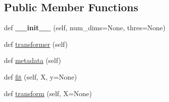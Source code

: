 \subsection*{Public Member Functions}
\begin{DoxyCompactItemize}
\item 
def {\bfseries \+\_\+\+\_\+init\+\_\+\+\_\+} (self, num\+\_\+dims=None, thres=None)\hypertarget{classdml_1_1pca_1_1PCA_a55d22d08e5f8617a880ac3af1dc355e2}{}\label{classdml_1_1pca_1_1PCA_a55d22d08e5f8617a880ac3af1dc355e2}

\item 
def \hyperlink{classdml_1_1pca_1_1PCA_a1a7f105ce4a9de19117b92c441ff53f5}{transformer} (self)
\item 
def \hyperlink{classdml_1_1pca_1_1PCA_a1e4361b3ecc20bbc7b1037739abb2101}{metadata} (self)
\item 
def \hyperlink{classdml_1_1pca_1_1PCA_a477310831a7b669598fb8d46b0700bb1}{fit} (self, X, y=None)
\item 
def \hyperlink{classdml_1_1pca_1_1PCA_a8c0378940c6a8c80952ffe2f1d582b54}{transform} (self, X=None)
\end{DoxyCompactItemize}

